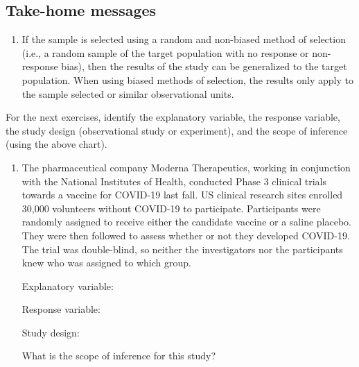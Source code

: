 \documentclass[
]{report}
\providecommand{\tightlist}{%
  \setlength{\itemsep}{0pt}\setlength{\parskip}{0pt}}
\begin{document}
\vspace{0.8in}

\newpage

\hypertarget{take-home-messages-1}{%
\subsection{Take-home messages}\label{take-home-messages-1}}

\begin{enumerate}
\def\labelenumi{\arabic{enumi}.}
\tightlist
\item
  If the sample is selected using a random and non-biased method of selection (i.e., a random sample of the target population with no response or non-response bias), then the results of the study can be generalized to the target population. When using biased methods of selection, the results only apply to the sample selected or similar observational units.
\end{enumerate}

For the next exercises, identify the explanatory variable, the response variable, the study design (observational study or experiment), and the scope of inference (using the above chart).

\begin{enumerate}
\def\labelenumi{\arabic{enumi}.}
\item
  The pharmaceutical company Moderna Therapeutics, working in conjunction with the National Institutes of Health, conducted Phase 3 clinical trials towards a vaccine for COVID-19 last fall. US clinical research sites enrolled 30,000 volunteers without COVID-19 to participate. Participants were randomly assigned to receive either the candidate vaccine or a saline placebo. They were then followed to assess whether or not they developed COVID-19. The trial was double-blind, so neither the investigators nor the participants knew who was assigned to which group.
  \vspace{0.1in}

  Explanatory variable:
  \vspace{0.25in}

  Response variable:
  \vspace{0.25in}

  Study design:
  \vspace{0.25in}

  What is the scope of inference for this study?
  \vspace{0.5in}
\end{enumerate}
\end{document}
